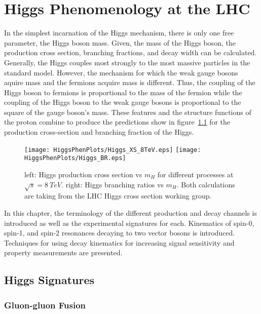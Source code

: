 \chapter{Higgs Phenomenology at the LHC}
\label{sec:HiggsPhen}

In the simplest incarnation of the Higgs mechanism, there is only one free
parameter, the Higgs boson mass.  Given, the mass of the Higgs boson, the production
cross section, branching fractions, and decay width can be calculated. 
Generally, the Higgs 
couples most strongly to the most massive particles in the standard model.  
However, the mechanism for which the weak gauge bosons aquire mass and the 
fermions acquire mass is different.  Thus, the coupling of the Higgs boson to 
fermions is proportional to the mass of the fermion while the coupling of the 
Higgs boson to the weak gauge bosons is proportional to the square of the gauge 
boson's mass. These features and the structure functions of the proton 
combine to produce the predictions show in figure~\ref{fig:HiggsProdXS} 
for the production 
cross-section and branching fraction of the Higgs.  
\begin{figure}
\begin{center}
\texttt{[image: HiggsPhenPlots/Higgs\_XS\_8TeV.eps]}
\texttt{[image: HiggsPhenPlots/Higgs\_BR.eps]}
\caption{left: Higgs production cross section vs $m_H$ for 
different processes at $\sqrt{s}=8~TeV$. right: Higgs branching
ratios vs $m_H$.  Both calculations are taking from the LHC Higgs
cross section working group. }
\label{fig:HiggsProdXS}
\end{center}
\end{figure}

In this chapter, the 
terminology of the different production and decay channels is introduced as 
well as the experimental signatures for each.  Kinematics of spin-0, spin-1, 
and spin-2 resonances decaying to two vector bosons is introduced.  
Techniques for using decay kinematics for increasing signal sensitivity
and property measurements are presented.  

\section{Higgs Signatures}

\subsection{Gluon-gluon Fusion}
\label{sec:ggHiggs}

